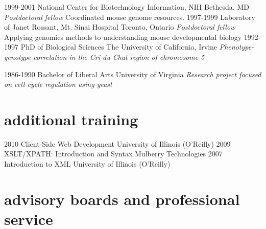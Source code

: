 \documentclass[]{dmc-cv} %
\begin{document}
\begin{entrylist}
\entry
{1999-2001}
{National Center for Biotechnology Information, NIH}
{Bethesda, MD}
{\emph{Postdoctoral fellow}
Coordinated mouse genome resources.
}
\entry
{1997-1999}
{Laboratory of Janet Rossant, Mt. Sinai Hospital}
{Toronto, Ontario}
{\emph{Postdoctoral fellow}
Applying genomics methods to understanding mouse developmental biology
}
\entry
{1992-1997}
{PhD {\normalfont of Biological Sciences}}
{The University of California, Irvine}
{\emph{Phenotype-genotype correlation in the Cri-du-Chat region of chromosome 5}
}

\entry
{1986-1990}
{Bachelor {\normalfont of Liberal Arts}}
{University of Virginia}
{\emph{Research project focused on cell cycle regulation using yeast}
}
\end{entrylist}


\section{additional training}

\begin{entrylist}
\smallentry
{2010}
{Client-Side Web Development}
{University of Illinois (O'Reilly)}
\smallentry
{2009}
{XSLT/XPATH: Introduction and Syntax}
{Mulberry Technologies}
\smallentry
{2007}
{Introduction to XML}
{University of Illinois (O'Reilly)}
\end{entrylist}


\section{advisory boards and professional service}
\end{document}

